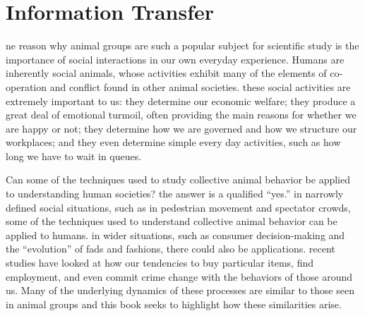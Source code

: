           
 \chapter[Template 95]{Information Transfer}         
          
 ne reason why animal groups are such a popular subject for scientific
study is the importance of social interactions in our own everyday experience.
Humans are inherently social animals, whose activities exhibit
many of the elements of co-operation and conflict found in other animal
societies. these social activities are extremely important to us: they determine
our economic welfare; they produce a great deal of emotional
turmoil, often providing the main reasons for whether we are happy
or not; they determine how we are governed and how we structure our
workplaces; and they even determine simple every day activities, such as
how long we have to wait in queues.

Can some of the techniques used to study collective animal behavior
be applied to understanding human societies? the answer is a qualified
“yes.” in narrowly defined social situations, such as in pedestrian movement
and spectator crowds, some of the techniques used to understand
collective animal behavior can be applied to humans. in wider situations,
such as consumer decision-making and the “evolution” of fads and fashions,
there could also be applications. recent studies have looked at how
our tendencies to buy particular items, find employment, and even commit
crime change with the behaviors of those around us. Many of the underlying
dynamics of these processes are similar to those seen in animal
groups and this book seeks to highlight how these similarities arise. 

